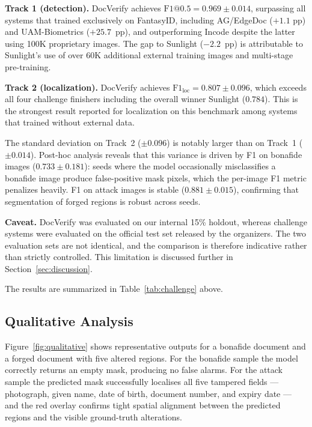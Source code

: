 \textbf{Track 1 (detection).} DocVerify achieves $\text{F1}@0.5 = 0.969 \pm 0.014$,
surpassing all systems that trained exclusively on FantasyID, including AG/EdgeDoc
($+1.1$ pp) and UAM-Biometrics ($+25.7$~pp), and outperforming Incode despite
the latter using 100K proprietary images. The gap to Sunlight ($-2.2$~pp) is
attributable to Sunlight's use of over 60K additional external training images and
multi-stage pre-training.

\textbf{Track 2 (localization).} DocVerify achieves $\text{F1}_{\text{loc}} =
0.807 \pm 0.096$, which exceeds all four challenge finishers including the overall
winner Sunlight ($0.784$). This is the strongest result reported for localization
on this benchmark among systems that trained without external data.

The standard deviation on Track~2 ($\pm 0.096$) is notably larger than on
Track~1 ($\pm 0.014$). Post-hoc analysis reveals that this variance is driven by
F1 on bonafide images ($0.733 \pm 0.181$): seeds where the model occasionally
misclassifies a bonafide image produce false-positive mask pixels, which the
per-image F1 metric penalizes heavily. F1 on attack images is stable
($0.881 \pm 0.015$), confirming that segmentation of forged regions is
robust across seeds.

\textbf{Caveat.} DocVerify was evaluated on our internal 15\% holdout, whereas
challenge systems were evaluated on the official test set released by the
organizers. The two evaluation sets are not identical, and the comparison is
therefore indicative rather than strictly controlled. This limitation is
discussed further in Section~\ref{sec:discussion}.

The results are summarized in Table~\ref{tab:challenge} above.

\subsection{Qualitative Analysis}
\label{subsec:qualitative}

Figure~\ref{fig:qualitative} shows representative outputs for a bonafide document
and a forged document with five altered regions. For the bonafide sample the model
correctly returns an empty mask, producing no false alarms. For the attack sample
the predicted mask successfully localises all five tampered fields --- photograph,
given name, date of birth, document number, and expiry date --- and the red overlay
confirms tight spatial alignment between the predicted regions and the visible
ground-truth alterations.

